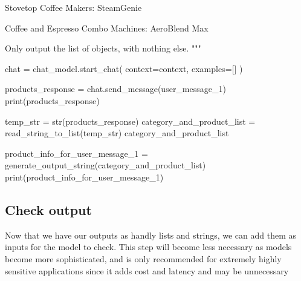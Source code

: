 \documentclass[
  letterpaper,
  DIV=11,
  numbers=noendperiod]{scrreprt}
\newenvironment{Shaded}{\begin{snugshade}}{\end{snugshade}}
\newcommand{\BuiltInTok}[1]{\textcolor[rgb]{0.00,0.23,0.31}{#1}}
\newcommand{\NormalTok}[1]{\textcolor[rgb]{0.00,0.23,0.31}{#1}}
\newcommand{\OperatorTok}[1]{\textcolor[rgb]{0.37,0.37,0.37}{#1}}
\newcommand{\SpecialStringTok}[1]{\textcolor[rgb]{0.13,0.47,0.30}{#1}}
\begin{document}
\begin{Shaded}
\begin{Highlighting}[]
\SpecialStringTok{Stovetop Coffee Makers:}
\SpecialStringTok{SteamGenie}

\SpecialStringTok{Coffee and Espresso Combo Machines:}
\SpecialStringTok{AeroBlend Max}

\SpecialStringTok{Only output the list of objects, with nothing else.}
\SpecialStringTok{"""}

\NormalTok{chat }\OperatorTok{=}\NormalTok{ chat\_model.start\_chat(}
\NormalTok{    context}\OperatorTok{=}\NormalTok{context,}
\NormalTok{    examples}\OperatorTok{=}\NormalTok{[]}
\NormalTok{)}

\NormalTok{products\_response }\OperatorTok{=}\NormalTok{ chat.send\_message(user\_message\_1)}
\BuiltInTok{print}\NormalTok{(products\_response)}
\end{Highlighting}
\end{Shaded}

\begin{Shaded}
\begin{Highlighting}[]
\NormalTok{temp\_str }\OperatorTok{=} \BuiltInTok{str}\NormalTok{(products\_response)}
\NormalTok{category\_and\_product\_list }\OperatorTok{=}\NormalTok{ read\_string\_to\_list(temp\_str)}
\NormalTok{category\_and\_product\_list}
\end{Highlighting}
\end{Shaded}

\begin{Shaded}
\begin{Highlighting}[]
\NormalTok{product\_info\_for\_user\_message\_1 }\OperatorTok{=}\NormalTok{ generate\_output\_string(category\_and\_product\_list)}
\BuiltInTok{print}\NormalTok{(product\_info\_for\_user\_message\_1)}
\end{Highlighting}
\end{Shaded}

\hypertarget{check-output-1}{%
\subsection{Check output}\label{check-output-1}}

Now that we have our outputs as handly lists and strings, we can add
them as inputs for the model to check. This step will become less
necessary as models become more sophisticated, and is only recommended
for extremely highly sensitive applications since it adds cost and
latency and may be unnecessary
\end{document}

